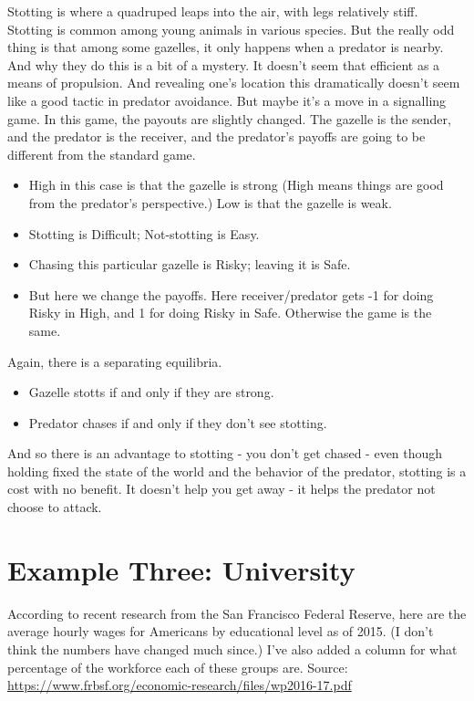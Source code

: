 \documentclass[11pt,]{article}
\providecommand{\tightlist}{%
  \setlength{\itemsep}{0pt}\setlength{\parskip}{0pt}}
\begin{document}
Stotting is where a quadruped leaps into the air, with legs relatively
stiff. Stotting is common among young animals in various species. But
the really odd thing is that among some gazelles, it only happens when a
predator is nearby. And why they do this is a bit of a mystery. It
doesn't seem that efficient as a means of propulsion. And revealing
one's location this dramatically doesn't seem like a good tactic in
predator avoidance. But maybe it's a move in a signalling game. In this
game, the payouts are slightly changed. The gazelle is the sender, and
the predator is the receiver, and the predator's payoffs are going to be
different from the standard game.

\begin{itemize}
\tightlist
\item
  High in this case is that the gazelle is strong (High means things are
  good from the predator's perspective.) Low is that the gazelle is
  weak.
\item
  Stotting is Difficult; Not-stotting is Easy.
\item
  Chasing this particular gazelle is Risky; leaving it is Safe.
\item
  But here we change the payoffs. Here receiver/predator gets -1 for
  doing Risky in High, and 1 for doing Risky in Safe. Otherwise the game
  is the same.
\end{itemize}

Again, there is a separating equilibria.

\begin{itemize}
\tightlist
\item
  Gazelle stotts if and only if they are strong.
\item
  Predator chases if and only if they don't see stotting.
\end{itemize}

And so there is an advantage to stotting - you don't get chased - even
though holding fixed the state of the world and the behavior of the
predator, stotting is a cost with no benefit. It doesn't help you get
away - it helps the predator not choose to attack.

\hypertarget{example-three-university}{%
\section{Example Three: University}\label{example-three-university}}

According to recent research from the San Francisco Federal Reserve,
here are the average hourly wages for Americans by educational level as
of 2015. (I don't think the numbers have changed much since.) I've also
added a column for what percentage of the workforce each of these groups
are. Source:
\url{https://www.frbsf.org/economic-research/files/wp2016-17.pdf}
\end{document}
